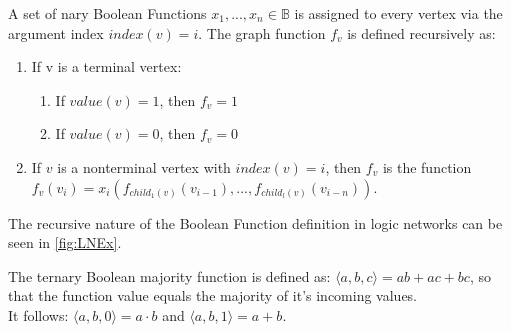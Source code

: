 \begin{definition}
	A set of nary Boolean Functions $x_1, ..., x_n \in \mathbb{B}$ is assigned to every vertex via the argument index $index(v) = i$. The graph function $f_v$ is defined recursively as:
	\begin{enumerate}
		\item If v is a terminal vertex:
		\begin{enumerate}
			\item If $value(v)=1$, then $f_v=1$
			\item If $value(v)=0$, then $f_v=0$
		\end{enumerate}
		\item If $v$ is a nonterminal vertex with $index(v)=i$, then $f_v$ is the function \\ 
		$f_v(v_i) = x_i(f_{child_1(v)}(v_{i-1}), ..., f_{child_l(v)}(v_{i-n}))$.
	\end{enumerate}
\end{definition}

The recursive nature of the Boolean Function definition in logic networks can be seen in \ref*{fig:LNEx}.

\begin{definition}\label{Def:majf}
	The ternary Boolean majority function is defined as: $\langle a, b, c \rangle = ab + ac + bc$, so that the function value equals the majority of it's incoming values.\\
	It follows: $\langle a, b, 0 \rangle = a \cdot b$ and $\langle a, b, 1 \rangle = a + b$.
\end{definition}

